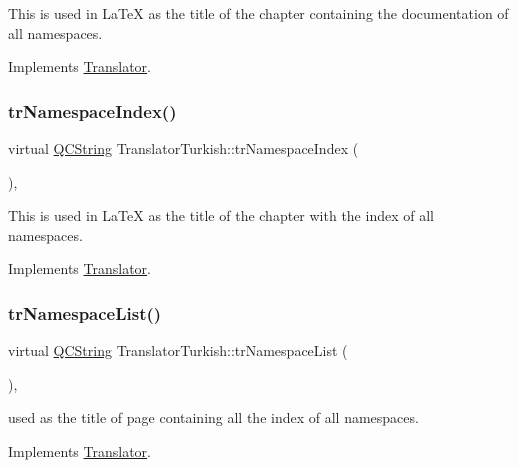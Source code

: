 This is used in La\+TeX as the title of the chapter containing the documentation of all namespaces. 

Implements \mbox{\hyperlink{class_translator}{Translator}}.

\mbox{\label{class_translator_turkish_a3aa09b20db17f81eca27143dd6fcb0ee}} 
\subsubsection{\texorpdfstring{trNamespaceIndex()}{trNamespaceIndex()}}
{\footnotesize\ttfamily virtual \mbox{\hyperlink{class_q_c_string}{Q\+C\+String}} Translator\+Turkish\+::tr\+Namespace\+Index (\begin{DoxyParamCaption}{ }\end{DoxyParamCaption})\hspace{0.3cm}{\ttfamily [inline]}, {\ttfamily [virtual]}}

This is used in La\+TeX as the title of the chapter with the index of all namespaces. 

Implements \mbox{\hyperlink{class_translator}{Translator}}.

\mbox{\label{class_translator_turkish_aa3cf32927aba683c52954d741c506986}} 
\subsubsection{\texorpdfstring{trNamespaceList()}{trNamespaceList()}}
{\footnotesize\ttfamily virtual \mbox{\hyperlink{class_q_c_string}{Q\+C\+String}} Translator\+Turkish\+::tr\+Namespace\+List (\begin{DoxyParamCaption}{ }\end{DoxyParamCaption})\hspace{0.3cm}{\ttfamily [inline]}, {\ttfamily [virtual]}}

used as the title of page containing all the index of all namespaces. 

Implements \mbox{\hyperlink{class_translator}{Translator}}.

\mbox{\label{class_translator_turkish_a4f754f8c678bd8fcc0ecef9a9fd7fb62}} 

